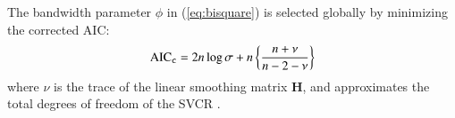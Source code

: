 \documentclass[authoryear, review, 11pt]{elsarticle}
\begin{document}
	The bandwidth parameter $\phi$ in (\ref{eq:bisquare}) is selected globally by minimizing the corrected AIC:	
	\begin{align}\label{eq:AICc}
		\text{AIC}_{\tt c} = 2 n \log{\sigma} + n \left\{\frac{n + \nu}{n - 2 - \nu}\right\}
	\end{align}	
	where $\nu$ is the trace of the linear smoothing matrix $\bm{H}$, and approximates the total degrees of freedom of the SVCR \citep{Hurvich:1998}.


		
		
	
	
\end{document}
